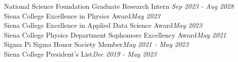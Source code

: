\documentclass[a4paper, 12pt]{article}
\begin{document}
National Science Foundation Graduate Research Intern \hfill \textit{Sep 2023 - Aug 2028} \\
Siena College Excellence in Physics Award\hfill \textit{May 2023} \\
Siena College Excellence in Applied Data Science Award\hfill \textit{May 2023} \\
Siena College Physics Department Sophomore Excellency Award\hfill \textit{May 2021} \\
Sigma Pi Sigma Honor Society Member\hfill \textit{May 2021 - May 2023} \\
Siena College President’s List\hfill \textit{Dec 2019 - May 2023} \\
\end{document}
